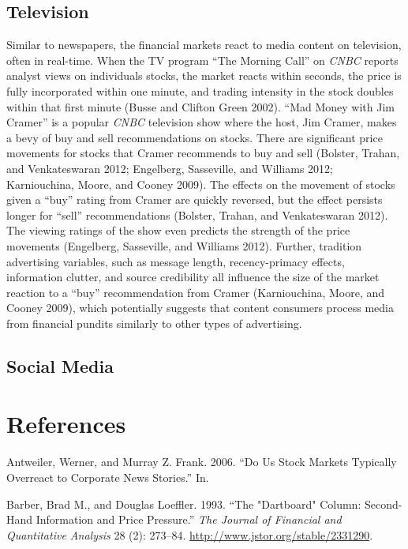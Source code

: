\documentclass[12pt,]{article}
\begin{document}
\hypertarget{television}{%
\subsection{Television}\label{television}}

Similar to newspapers, the financial markets react to media content on
television, often in real-time. When the TV program ``The Morning Call''
on \emph{CNBC} reports analyst views on individuals stocks, the market
reacts within seconds, the price is fully incorporated within one
minute, and trading intensity in the stock doubles within that first
minute (Busse and Clifton Green 2002). ``Mad Money with Jim Cramer'' is
a popular \emph{CNBC} television show where the host, Jim Cramer, makes
a bevy of buy and sell recommendations on stocks. There are significant
price movements for stocks that Cramer recommends to buy and sell
(Bolster, Trahan, and Venkateswaran 2012; Engelberg, Sasseville, and
Williams 2012; Karniouchina, Moore, and Cooney 2009). The effects on the
movement of stocks given a ``buy'' rating from Cramer are quickly
reversed, but the effect persists longer for ``sell'' recommendations
(Bolster, Trahan, and Venkateswaran 2012). The viewing ratings of the
show even predicts the strength of the price movements (Engelberg,
Sasseville, and Williams 2012). Further, tradition advertising
variables, such as message length, recency-primacy effects, information
clutter, and source credibility all influence the size of the market
reaction to a ``buy'' recommendation from Cramer (Karniouchina, Moore,
and Cooney 2009), which potentially suggests that content consumers
process media from financial pundits similarly to other types of
advertising.

\hypertarget{social-media}{%
\subsection{Social Media}\label{social-media}}

\hypertarget{references}{%
\section*{References}\label{references}}

\hypertarget{refs}{}
\leavevmode\hypertarget{ref-antweiler2006}{}%
Antweiler, Werner, and Murray Z. Frank. 2006. ``Do Us Stock Markets
Typically Overreact to Corporate News Stories.'' In.

\leavevmode\hypertarget{ref-barber1993}{}%
Barber, Brad M., and Douglas Loeffler. 1993. ``The "Dartboard" Column:
Second-Hand Information and Price Pressure.'' \emph{The Journal of
Financial and Quantitative Analysis} 28 (2): 273--84.
\url{http://www.jstor.org/stable/2331290}.
\end{document}
